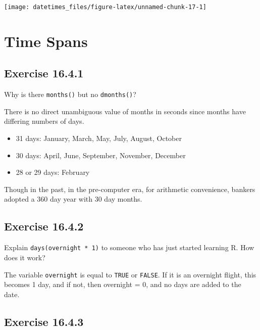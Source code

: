 \documentclass[]{book}
\providecommand{\tightlist}{%
  \setlength{\itemsep}{0pt}\setlength{\parskip}{0pt}}
\theoremstyle{plain}
\theoremstyle{remark}
\begin{document}
\begin{center}\texttt{[image: datetimes\_files/figure-latex/unnamed-chunk-17-1]} \end{center}

\hypertarget{time-spans}{%
\section{Time Spans}\label{time-spans}}

\hypertarget{exercise-16.4.1}{%
\subsection*{\texorpdfstring{Exercise
{16.4.1}}{Exercise 16.4.1}}\label{exercise-16.4.1}}

Why is there \texttt{months()} but no \texttt{dmonths()}?

There is no direct unambiguous value of months in seconds since months
have differing numbers of days.

\begin{itemize}
\tightlist
\item
  31 days: January, March, May, July, August, October
\item
  30 days: April, June, September, November, December
\item
  28 or 29 days: February
\end{itemize}

Though in the past, in the pre-computer era, for arithmetic convenience,
bankers adopted a 360 day year with 30 day months.

\hypertarget{exercise-16.4.2}{%
\subsection*{\texorpdfstring{Exercise
{16.4.2}}{Exercise 16.4.2}}\label{exercise-16.4.2}}

Explain \texttt{days(overnight\ *\ 1)} to someone who has just started
learning R. How does it work?

The variable \texttt{overnight} is equal to \texttt{TRUE} or
\texttt{FALSE}. If it is an overnight flight, this becomes 1 day, and if
not, then overnight = 0, and no days are added to the date.

\hypertarget{exercise-16.4.3}{%
\subsection*{\texorpdfstring{Exercise
{16.4.3}}{Exercise 16.4.3}}\label{exercise-16.4.3}}
\end{document}
